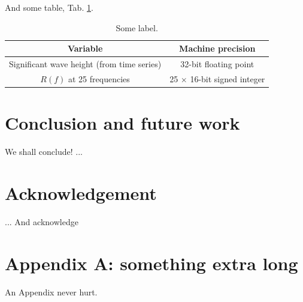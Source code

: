 \documentclass{article}
\begin{document}
And some table, Tab. \ref{tab:tab_handle}.

\begin{table}[h]
\begin{center}
	\begin{tabular}{c|c}
	Variable & Machine precision \\ \hline
		Significant wave height (from time series) & 32-bit floating point \\
		$R(f)$ at 25 frequencies & 25 $\times$ 16-bit signed integer 
	\end{tabular}
	\end{center}
	\caption{Some label.}
	\label{tab:tab_handle}
\end{table}

\section{Conclusion and future work}

We shall conclude! ...

\section*{Acknowledgement}

... And acknowledge

\section*{Appendix A: something extra long}

An Appendix never hurt.



\end{document}
